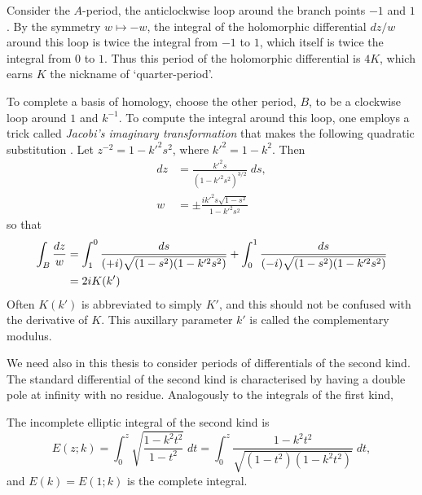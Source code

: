 
Consider the $A$-period, the anticlockwise loop around the branch points $-1$ and $1$. By the symmetry $w \mapsto -w$, the integral of the holomorphic differential $dz / w $ around this loop is twice the integral from $-1$ to $1$, which itself is twice the integral from $0$ to $1$. Thus this period of the holomorphic differential is $4K$, which earns $K$ the nickname of `quarter-period'.


To complete a basis of homology, choose the other period, $B$, to be a clockwise loop around $1$ and $k^{-1}$. To compute the integral around this loop, one employs a trick called \emph{Jacobi's imaginary transformation} that makes the following quadratic substitution \cite{Whittaker2000}. Let $z^{-2} = 1-k'^2 s^2$, where $k'^2 = 1 - k^2$. Then
\begin{align*}
dz &= \frac{k'^2 s}{(1-k'^2 s^2)^{3/2}}\;ds, \\
w &= \pm \frac{i k'^2 s \sqrt {1-s^2}}{1-k'^2 s^2}
\end{align*}
so that
\begin{align*}
\int_B \frac{dz}{w}
&= \int_1^0 \frac{ds}{(+i)\sqrt{(1-s^2)(1-k'^2 s^2)}} + \int_0^1 \frac{ds}{(-i)\sqrt{(1-s^2)(1-k'^2 s^2)}}\\
&= 2i K(k')
\end{align*}
Often $K(k')$ is abbreviated to simply $K'$, and this should not be confused with the derivative of $K$. This auxillary parameter $k'$ is called the complementary modulus.


We need also in this thesis to consider periods of differentials of the second kind. The standard differential of the second kind is characterised by having a double pole at infinity with no residue. Analogously to the integrals of the first kind,

\begin{defn}
The incomplete elliptic integral of the second kind is
\[
E(z;k) = \int_0^z \sqrt{\frac{1-k^2 t^2}{1-t^2}} \;dt = \int_0^z \frac{1-k^2 t^2}{\sqrt{(1-t^2)(1-k^2 t^2)}}\;dt,
\]
and $E(k) = E(1;k)$ is the complete integral.
\end{defn}

